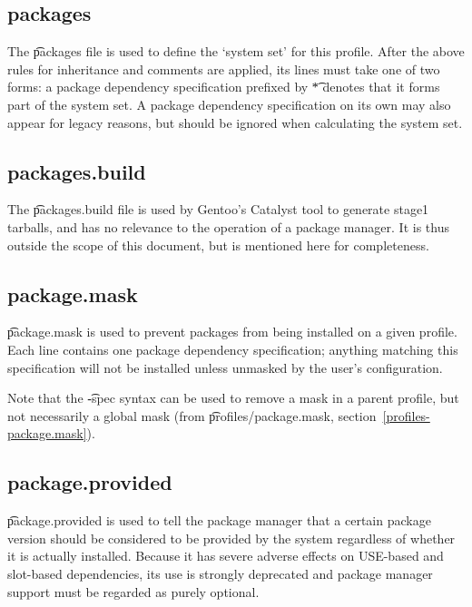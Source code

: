 \subsection{packages}
The \t{packages} file is used to define the `system set' for this profile.
After the above rules for inheritance and comments are applied, its lines must take one of two
forms: a package dependency specification prefixed by \t{*} denotes that it forms part of the
system set. A package dependency specification on its own may also appear for legacy reasons, but
should be ignored when calculating the system set.

\subsection{packages.build}
The \t{packages.build} file is used by Gentoo's Catalyst tool to generate stage1 tarballs, and has
no relevance to the operation of a package manager. It is thus outside the scope of this document,
but is mentioned here for completeness.

\subsection{package.mask}
\t{package.mask} is used to prevent packages from being installed on a given profile. Each line
contains one package dependency specification; anything matching this specification will not be
installed unless unmasked by the user's configuration.

Note that the \t{-spec} syntax can be used to remove a mask in a parent profile, but not
necessarily a global mask (from \t{profiles/package.mask}, section~\ref{profiles-package.mask}).


\subsection{package.provided}
\t{package.provided} is used to tell the package manager that a certain package version should be
considered to be provided by the system regardless of whether it is actually installed. Because it
has severe adverse effects on USE-based and slot-based dependencies, its use is strongly deprecated
and package manager support must be regarded as purely optional.


